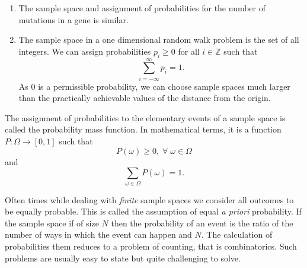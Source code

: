 \documentclass{article}
\begin{document}
\begin{enumerate}
\item The sample space and assignment of probabilities for the number of
mutations in a gene is similar.

\item The sample space in a one dimensional random walk problem is the
set of all integers. We can assign probabilities $p_i \ge 0$ for all $i
\in \mathbb{Z}$ such that 
\begin{equation}\label{e9}
\sum_{i=-\infty}^{\infty} p_i = 1.
\end{equation}
As $0$ is a permissible probability, we can choose sample spaces much 
larger than the practically achievable values of the distance from the 
origin.
\end{enumerate}

The assignment of probabilities to the elementary events of a sample space
is called the probability mass function. In mathematical terms, it is a
function $P: \Omega \rightarrow [0, 1]$ such that
\begin{equation}\label{e10}
P(\omega) \ge 0, \;\forall\; \omega \in \Omega
\end{equation}
and
\begin{equation}\label{e11}
\sum_{\omega \in \Omega}P(\omega) = 1.
\end{equation}

Often times while dealing with \emph{finite} sample spaces we consider all
outcomes to be equally probable. This is called the assumption of equal
\emph{a priori} probability. If the sample space if of size $N$ then the
probability of an event is the ratio of the number of ways in which the 
event can happen and $N$. The calculation of probabilities them reduces to
a problem of counting, that is combinatorics. Such problems are usually
easy to state but quite challenging to solve.
\end{document}
